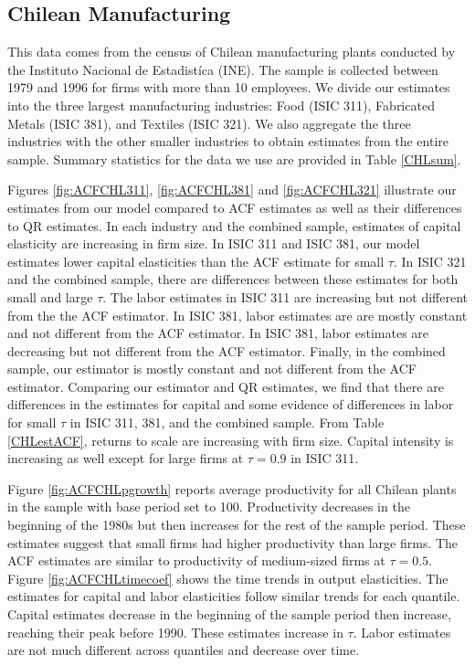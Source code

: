 \documentclass[11pt]{article}
\begin{document}

\subsection{Chilean Manufacturing}
This data comes from the census of Chilean manufacturing plants conducted by the Instituto Nacional de Estadist\'ica (INE). The sample is collected between 1979 and 1996 for firms with more than 10 employees. We divide our estimates into the three largest manufacturing industries: Food (ISIC 311), Fabricated Metals (ISIC 381), and Textiles (ISIC 321). We also aggregate the three industries with the other smaller industries to obtain estimates from the entire sample. Summary statistics for the data we use are provided in Table \ref{CHLsum}.

Figures \ref{fig:ACFCHL311}, \ref{fig:ACFCHL381} and \ref{fig:ACFCHL321} illustrate our estimates from our model compared to ACF estimates as well as their differences to QR estimates. In each industry and the combined sample, estimates of capital elasticity are increasing in firm size. In ISIC 311 and ISIC 381, our model estimates lower capital elasticities than the ACF estimate for small $\tau$. In ISIC 321 and the combined sample, there are differences between these estimates for both small and large $\tau$. The labor estimates in ISIC 311 are increasing but not different from the the ACF estimator. In ISIC 381, labor estimates are are mostly constant and not different from the ACF estimator. In ISIC 381, labor estimates are decreasing but not different from the ACF estimator. Finally, in the combined sample, our estimator is mostly constant and not different from the ACF estimator. Comparing our estimator and QR estimates, we find that there are differences in the estimates for capital and some evidence of differences in labor for small $\tau$ in ISIC 311, 381, and the combined sample. From Table \ref{CHLestACF}, returns to scale are increasing with firm size. Capital intensity is increasing as well except for large firms at $\tau=0.9$ in ISIC 311.

Figure \ref{fig:ACFCHLpgrowth} reports average productivity for all Chilean plants in the sample with base period set to 100. Productivity decreases in the beginning of the 1980s but then increases for the rest of the sample period. These estimates suggest that small firms had higher productivity than large firms. The ACF estimates are similar to productivity of medium-sized firms at $\tau=0.5$. Figure \ref{fig:ACFCHLtimecoef} shows the time trends in output elasticities. The estimates for capital and labor elasticities follow similar trends for each quantile. Capital estimates decrease in the beginning of the sample period then increase, reaching their peak before 1990. These estimates increase in $\tau$. Labor estimates are not much different across quantiles and decrease over time.
\end{document}
